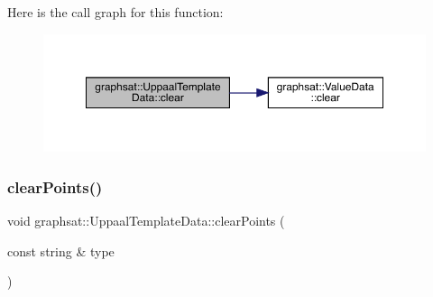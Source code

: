 Here is the call graph for this function\+:
\nopagebreak
\begin{figure}[H]
\begin{center}
\leavevmode
\includegraphics[width=350pt]{classgraphsat_1_1_uppaal_template_data_a2613193aee357282a262ea27fb672ed7_cgraph}
\end{center}
\end{figure}
\mbox{\label{classgraphsat_1_1_uppaal_template_data_af0588cce20cfbd447cddadabebc2b2a9}} 
\subsubsection{\texorpdfstring{clearPoints()}{clearPoints()}\hspace{0.1cm}{\footnotesize\ttfamily [1/2]}}
{\footnotesize\ttfamily void graphsat\+::\+Uppaal\+Template\+Data\+::clear\+Points (\begin{DoxyParamCaption}\item[{const string \&}]{type }\end{DoxyParamCaption})\hspace{0.3cm}{\ttfamily [inline]}}

